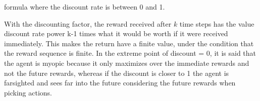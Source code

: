 formula 
where the discount rate is between 0 and 1.

With the discounting factor, the reward received after $k$ time steps has the value discount rate power k-1 times what it would be worth if it were received immediately. This makes the return have a finite value, under the condition that the reward sequence is finite. In the extreme point of discount = 0, it is said that the agent is myopic because it only maximizes over the immediate rewards and not the future rewards, whereas if the discount is closer to 1 the agent is farsighted and sees far into the future considering the future rewards when picking actions.